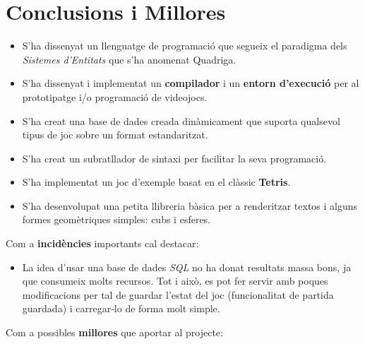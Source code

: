 \chapter{Conclusions i Millores}
\label{chap:Conclusions}


\begin{itemize}
  \item S'ha dissenyat un llenguatge de programació que segueix el paradigma dels {\em Sistemes d'Entitats} que s'ha anomenat Quadriga.
  \item S'ha dissenyat i implementat un {\bf compilador} i un {\bf entorn d'execució} per al prototipatge i/o programació de videojocs.
  \item S'ha creat una base de dades creada dinàmicament que suporta qualsevol tipus de joc sobre un format estandaritzat.
  \item S'ha creat un subratllador de sintaxi per facilitar la seva programació.
  \item S'ha implementat un joc d'exemple basat en el clàssic {\bf Tetris}.
  \item S'ha desenvolupat una petita llibreria bàsica per a renderitzar textos i alguns formes geomètriques simples: cubs i esferes.
\end{itemize}

Com a {\bf incidències} importants cal destacar:

\begin{itemize}
  \item La idea d'usar una base de dades {\em SQL} no ha donat resultats massa bons, ja que consumeix molts recursos. Tot i això, es pot fer servir amb poques modificacions per tal de guardar l'estat del joc (funcionalitat de partida guardada) i carregar-lo de forma molt simple.
\end{itemize}

Com a possibles {\bf millores} que aportar al projecte:


